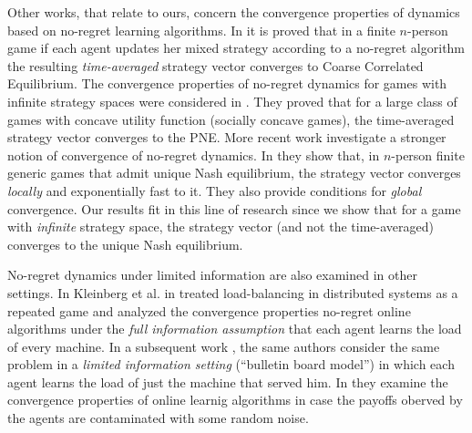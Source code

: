 Other works, that relate to ours, concern the convergence
properties of dynamics based on no-regret learning algorithms.
In \cite{FV97,FS99,SA00,SALS15} it is proved that in a finite $n$-person
game if each agent updates her mixed strategy according to a no-regret
algorithm the resulting \emph{time-averaged} strategy vector converges to
Coarse Correlated Equilibrium. The convergence properties of no-regret dynamics
for games with infinite strategy spaces were considered in \cite{EMN09}.
They proved that for a large class of games with concave utility function
(socially concave games), the time-averaged strategy vector converges to
the PNE. More recent work investigate a stronger notion of convergence of
no-regret dynamics. In \cite{CHM17} they show that,
in $n$-person finite generic games that admit unique Nash equilibrium,
the strategy vector converges \emph{locally} and exponentially fast
to it. They also provide conditions for \emph{global} convergence.
Our results fit in this line of research since we show that
for a game with \emph{infinite} strategy space, the strategy vector
(and not the time-averaged) converges to the unique Nash equilibrium.

No-regret dynamics under limited information are also examined
in other settings. In Kleinberg et al. in \cite{KPT09} treated
load-balancing in distributed systems as
a repeated game and analyzed the convergence properties
no-regret online algorithms under the \emph{full information assumption}
that each agent learns the load of every machine.
In a subsequent work \cite{KPT11}, the same authors consider the
same problem in a \emph{limited information setting} (\enquote{bulletin board model})
in which each agent learns the load of just the machine
that served him. In \cite{HCM17,MS17} they examine the convergence
properties of online learnig algorithms in case the payoffs oberved
by the agents are contaminated with some random noise.





